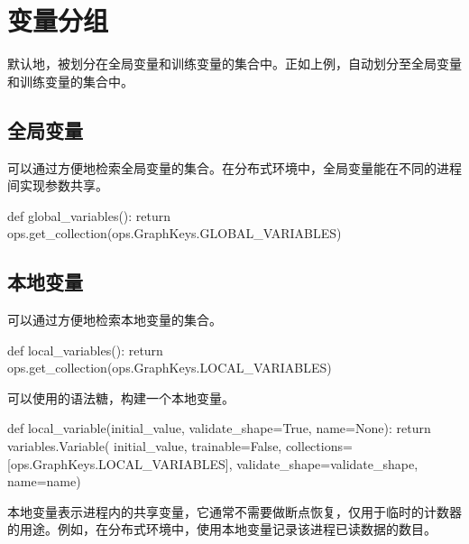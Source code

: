 \section{变量分组}

\begin{content}

默认地，被划分在全局变量和训练变量的集合中。正如上例，自动划分至全局变量和训练变量的集合中。

\subsection{全局变量}

可以通过方便地检索全局变量的集合。在分布式环境中，全局变量能在不同的进程间实现参数共享。

\begin{leftbar}
\begin{python}
def global_variables():
  return ops.get_collection(ops.GraphKeys.GLOBAL_VARIABLES)
\end{python}
\end{leftbar}

\subsection{本地变量}

可以通过方便地检索本地变量的集合。

\begin{leftbar}
\begin{python}
def local_variables():
  return ops.get_collection(ops.GraphKeys.LOCAL_VARIABLES)
\end{python}
\end{leftbar}

可以使用的语法糖，构建一个本地变量。

\begin{leftbar}
\begin{python}
def local_variable(initial_value, validate_shape=True, name=None):
  return variables.Variable(
      initial_value, trainable=False,
      collections=[ops.GraphKeys.LOCAL_VARIABLES],
      validate_shape=validate_shape, name=name)
\end{python}
\end{leftbar}

本地变量表示进程内的共享变量，它通常不需要做断点恢复，仅用于临时的计数器的用途。例如，在分布式环境中，使用本地变量记录该进程已读数据的数目。


\end{content}
